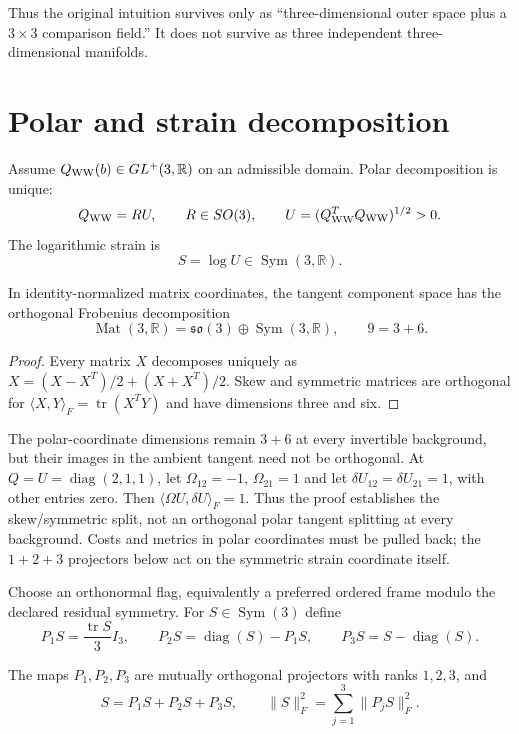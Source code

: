\documentclass[11pt]{article}
\begin{document}
Thus the original intuition survives only as ``three-dimensional outer space
plus a $3\times3$ comparison field.''  It does not survive as three independent
three-dimensional manifolds.

\section{Polar and strain decomposition}

Assume $Q_{\rm WW}(b)\in GL^+(3,\mathbb R)$ on an admissible domain.  Polar
decomposition is unique:
\[
 Q_{\rm WW}=RU,
 \qquad R\in SO(3),
 \qquad U=(Q_{\rm WW}^{T}Q_{\rm WW})^{1/2}>0.
\]
The logarithmic strain is
\[
 S=\log U\in\operatorname{Sym}(3,\mathbb R).
\]

\begin{theorem}
In identity-normalized matrix coordinates, the tangent component space has
the orthogonal Frobenius decomposition
\[
 \operatorname{Mat}(3,\mathbb R)
 =\mathfrak{so}(3)\oplus\operatorname{Sym}(3,\mathbb R),
 \qquad 9=3+6.
\]
\end{theorem}

\begin{proof}
Every matrix $X$ decomposes uniquely as
$X=(X-X^T)/2+(X+X^T)/2$.  Skew and symmetric matrices are orthogonal for
$\langle X,Y\rangle_F=\operatorname{tr}(X^TY)$ and have dimensions three and
six.
\end{proof}

The polar-coordinate dimensions remain $3+6$ at every invertible background,
but their images in the ambient tangent need not be orthogonal. At
$Q=U=\operatorname{diag}(2,1,1)$, let $\Omega_{12}=-1$,
$\Omega_{21}=1$ and let $\delta U_{12}=\delta U_{21}=1$, with other entries
zero. Then $\langle\Omega U,\delta U\rangle_F=1$. Thus the proof establishes
the skew/symmetric split, not an orthogonal polar tangent splitting at every
background. Costs and metrics in polar coordinates must be pulled back;
the $1+2+3$ projectors below act on the symmetric strain coordinate itself.

Choose an orthonormal flag, equivalently a preferred ordered frame modulo the
declared residual symmetry.  For $S\in\operatorname{Sym}(3)$ define
\[
 P_1S=\frac{\operatorname{tr}S}{3}I_3,
 \qquad
 P_2S=\operatorname{diag}(S)-P_1S,
 \qquad
 P_3S=S-\operatorname{diag}(S).
\]

\begin{theorem}
The maps $P_1,P_2,P_3$ are mutually orthogonal projectors with ranks
$1,2,3$, and
\[
 S=P_1S+P_2S+P_3S,
 \qquad
 \|S\|_F^2=\sum_{j=1}^3\|P_jS\|_F^2.
\]
\end{theorem}
\end{document}
